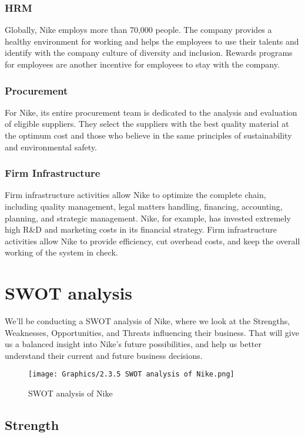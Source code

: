 \documentclass[a4paper, 12pt]{report}
\begin{document}
\subsubsection{HRM}
Globally, Nike employs more than 70,000 people. The company provides a healthy environment for working and helps the employees to use their talents and identify with the company culture of diversity and inclusion. Rewards programs for employees are another incentive for employees to stay with the company. 
\subsubsection{Procurement}
For Nike, its entire procurement team is dedicated to the analysis and evaluation of eligible suppliers. They select the suppliers with the best quality material at the optimum cost and those who believe in the same principles of sustainability and environmental safety.
\subsubsection{Firm Infrastructure}
Firm infrastructure activities allow Nike to optimize the complete chain, including quality management, legal matters handling, financing, accounting, planning, and strategic management. Nike, for example, has invested extremely high R&D and marketing costs in its financial strategy. Firm infrastructure activities allow Nike to provide efficiency, cut overhead costs, and keep the overall working of the system in check.
\section{SWOT analysis}
We’ll be conducting a SWOT analysis of Nike, where we look at the Strengths, Weaknesses, Opportunities, and Threats influencing their business. That will give us a balanced insight into Nike’s future possibilities, and help us better understand their current and future business decisions.
 \begin{figure}[ht]
 			\begin{center}
				\texttt{[image: Graphics/2.3.5 SWOT analysis of Nike.png]}
			\end{center}
       		\caption{\label{2.3.5}SWOT analysis of Nike}
 \end{figure}
\subsection{Strength}
\end{document}
